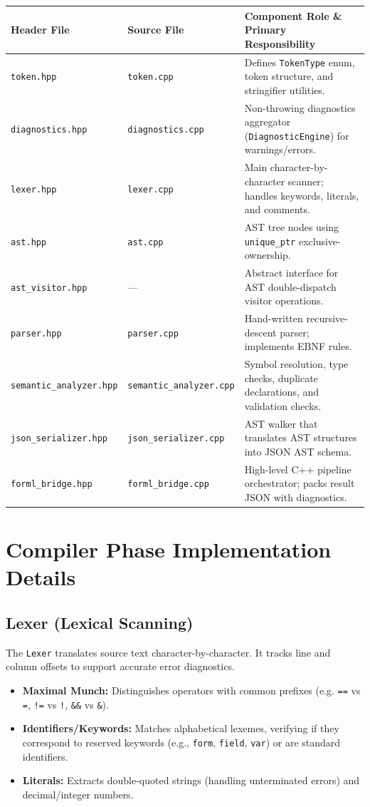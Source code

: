 \documentclass[10pt,a4paper]{article}
\begin{document}
\begin{table}[h!]
\centering
\small
\begin{tabular}{llp{7.5cm}}
\toprule
\textbf{Header File} & \textbf{Source File} & \textbf{Component Role \& Primary Responsibility} \\
\midrule
\texttt{token.hpp} & \texttt{token.cpp} & Defines \texttt{TokenType} enum, token structure, and stringifier utilities. \\
\texttt{diagnostics.hpp} & \texttt{diagnostics.cpp} & Non-throwing diagnostics aggregator (\texttt{DiagnosticEngine}) for warnings/errors. \\
\texttt{lexer.hpp} & \texttt{lexer.cpp} & Main character-by-character scanner; handles keywords, literals, and comments. \\
\texttt{ast.hpp} & \texttt{ast.cpp} & AST tree nodes using \texttt{unique\_ptr} exclusive-ownership. \\
\texttt{ast\_visitor.hpp} & --- & Abstract interface for AST double-dispatch visitor operations. \\
\texttt{parser.hpp} & \texttt{parser.cpp} & Hand-written recursive-descent parser; implements EBNF rules. \\
\texttt{semantic\_analyzer.hpp} & \texttt{semantic\_analyzer.cpp} & Symbol resolution, type checks, duplicate declarations, and validation checks. \\
\texttt{json\_serializer.hpp} & \texttt{json\_serializer.cpp} & AST walker that translates AST structures into JSON AST schema. \\
\texttt{forml\_bridge.hpp} & \texttt{forml\_bridge.cpp} & High-level C++ pipeline orchestrator; packs result JSON with diagnostics. \\
\bottomrule
\end{tabular}
\end{table}

\section{Compiler Phase Implementation Details}

\subsection{Lexer (Lexical Scanning)}
The \texttt{Lexer} translates source text character-by-character. It tracks line and column offsets to support accurate error diagnostics.
\begin{itemize}[leftmargin=*]
  \item \textbf{Maximal Munch:} Distinguishes operators with common prefixes (e.g. \texttt{==} vs \texttt{=}, \texttt{!=} vs \texttt{!}, \texttt{\&\&} vs \texttt{\&}).
  \item \textbf{Identifiers/Keywords:} Matches alphabetical lexemes, verifying if they correspond to reserved keywords (e.g., \texttt{form}, \texttt{field}, \texttt{var}) or are standard identifiers.
  \item \textbf{Literals:} Extracts double-quoted strings (handling unterminated errors) and decimal/integer numbers.
\end{itemize}
\end{document}
